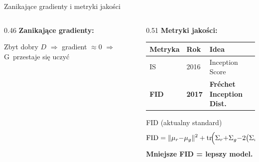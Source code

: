 \documentclass[aspectratio=169,12pt]{beamer}
\begin{document}
\begin{frame}{Zanikające gradienty i metryki jakości}
\begin{columns}[T]
\begin{column}{0.46\textwidth}
\textbf{Zanikające gradienty:}
{\small Zbyt dobry $D$ $\Rightarrow$ gradient $\approx 0$ $\Rightarrow$ G~przestaje się uczyć}
\end{column}
\begin{column}{0.51\textwidth}
\textbf{Metryki jakości:}
\vspace{0.4em}

\begin{tabular}{@{}lll@{}}
\toprule Metryka & Rok & Idea \\ \midrule
IS & 2016 & Inception Score \\
\textbf{FID} & \textbf{2017} & \textbf{Fréchet Inception Dist.} \\
\bottomrule
\end{tabular}

\vspace{0.5em}
\begin{block}{FID (aktualny standard)}
\[
\mathrm{FID} = \|\mu_r{-}\mu_g\|^2
+ \mathrm{tr}\!\Bigl(\Sigma_r{+}\Sigma_g
  {-}2\bigl(\Sigma_r\Sigma_g\bigr)^{\!\frac{1}{2}}\Bigr)
\]
\textbf{Mniejsze FID = lepszy model.}
\end{block}
\end{column}
\end{columns}
\end{frame}
\end{document}
